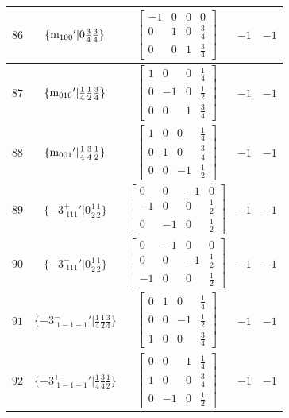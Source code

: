 \documentclass[fleqn,8pt]{jsarticle}
\begin{document}
\begin{longtable}{ccccc}
$ 86 $ & $ \{{\rm m}_{100}{}'|0 \frac{3}{4} \frac{3}{4}\} $ & $ \begin{bmatrix} -1 & 0 & 0 & 0 \\ 0 & 1 & 0 & \frac{3}{4} \\ 0 & 0 & 1 & \frac{3}{4} \end{bmatrix} $ & $ -1 $ & $ -1 $ \\ \hline
$ 87 $ & $ \{{\rm m}_{010}{}'|\frac{1}{4} \frac{1}{2} \frac{3}{4}\} $ & $ \begin{bmatrix} 1 & 0 & 0 & \frac{1}{4} \\ 0 & -1 & 0 & \frac{1}{2} \\ 0 & 0 & 1 & \frac{3}{4} \end{bmatrix} $ & $ -1 $ & $ -1 $ \\ \hline
$ 88 $ & $ \{{\rm m}_{001}{}'|\frac{1}{4} \frac{3}{4} \frac{1}{2}\} $ & $ \begin{bmatrix} 1 & 0 & 0 & \frac{1}{4} \\ 0 & 1 & 0 & \frac{3}{4} \\ 0 & 0 & -1 & \frac{1}{2} \end{bmatrix} $ & $ -1 $ & $ -1 $ \\ \hline
$ 89 $ & $ \{-3^{+}_{\,\,111}{}'|0 \frac{1}{2} \frac{1}{2}\} $ & $ \begin{bmatrix} 0 & 0 & -1 & 0 \\ -1 & 0 & 0 & \frac{1}{2} \\ 0 & -1 & 0 & \frac{1}{2} \end{bmatrix} $ & $ -1 $ & $ -1 $ \\ \hline
$ 90 $ & $ \{-3^{-}_{\,\,111}{}'|0 \frac{1}{2} \frac{1}{2}\} $ & $ \begin{bmatrix} 0 & -1 & 0 & 0 \\ 0 & 0 & -1 & \frac{1}{2} \\ -1 & 0 & 0 & \frac{1}{2} \end{bmatrix} $ & $ -1 $ & $ -1 $ \\ \hline
$ 91 $ & $ \{-3^{-}_{\,\,1-1-1}{}'|\frac{1}{4} \frac{1}{2} \frac{3}{4}\} $ & $ \begin{bmatrix} 0 & 1 & 0 & \frac{1}{4} \\ 0 & 0 & -1 & \frac{1}{2} \\ 1 & 0 & 0 & \frac{3}{4} \end{bmatrix} $ & $ -1 $ & $ -1 $ \\ \hline
$ 92 $ & $ \{-3^{+}_{\,\,1-1-1}{}'|\frac{1}{4} \frac{3}{4} \frac{1}{2}\} $ & $ \begin{bmatrix} 0 & 0 & 1 & \frac{1}{4} \\ 1 & 0 & 0 & \frac{3}{4} \\ 0 & -1 & 0 & \frac{1}{2} \end{bmatrix} $ & $ -1 $ & $ -1 $ \\ \hline

\end{longtable}
\end{document}
